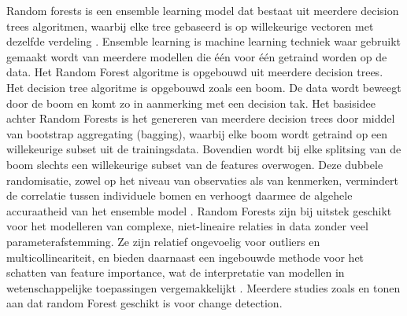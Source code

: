 Random forests is een ensemble learning model dat bestaat uit meerdere decision trees algoritmen, 
waarbij elke tree gebaseerd is op willekeurige vectoren met dezelfde verdeling \autocite{Breiman_2001}. 
Ensemble learning is machine learning techniek waar gebruikt gemaakt wordt van meerdere modellen die één voor één getraind worden op de data.
Het Random Forest algoritme is opgebouwd uit meerdere decision trees. Het decision tree algoritme is opgebouwd zoals een boom.
De data wordt beweegt door de boom en komt zo in aanmerking met een decision tak.
\newline 
\newline
Het basisidee achter Random Forests is het genereren van meerdere decision trees door middel van bootstrap aggregating (bagging), waarbij 
elke boom wordt getraind op een willekeurige subset uit de trainingsdata. Bovendien wordt bij elke splitsing van de boom slechts een 
willekeurige subset van de features overwogen. Deze dubbele randomisatie, zowel op het niveau van observaties als van kenmerken, vermindert de correlatie 
tussen individuele bomen en verhoogt daarmee de algehele accuraatheid van het ensemble model \autocite{liaw2002classification}.
\newline 
\newline
Random Forests zijn bij uitstek geschikt voor het modelleren van complexe, niet-lineaire relaties in data zonder veel parameterafstemming. 
Ze zijn relatief ongevoelig voor outliers en multicollineariteit, en bieden daarnaast een ingebouwde methode voor het schatten van feature importance, 
wat de interpretatie van modellen in wetenschappelijke toepassingen vergemakkelijkt \autocite{pal2005random}.
Meerdere studies zoals \textcite{Wessels_2016} en \textcite{Feng_2018} tonen aan dat 
random Forest geschikt is voor change detection.
\newline
\newline

